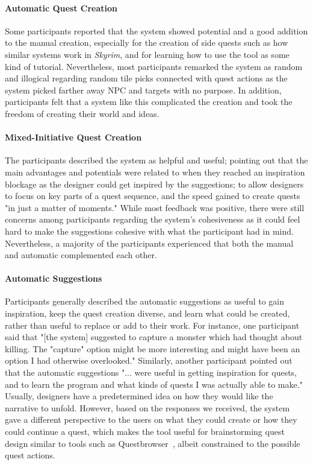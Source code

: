 \paragraph{Automatic Quest Creation}

Some participants reported that the system showed potential and a good addition to the manual creation, especially for the creation of side quests such as how similar systems work in \emph{Skyrim}, and for learning how to use the tool as some kind of tutorial. Nevertheless, most participants remarked the system as random and illogical regarding random tile picks connected with quest actions as the system picked farther away NPC and targets with no purpose. In addition, participants felt that a system like this complicated the creation and took the freedom of creating their world and ideas. 

\paragraph{Mixed-Initiative Quest Creation}

The participants described the system as helpful and useful; pointing out that the main advantages and potentials were related to when they reached an inspiration blockage as the designer could get inspired by the suggestions; to allow designers to focus on key parts of a quest sequence, and the speed gained to create quests "in just a matter of moments." While most feedback was positive, there were still concerns among participants regarding the system's cohesiveness as it could feel hard to make the suggestions cohesive with what the participant had in mind. Nevertheless, a majority of the participants experienced that both the manual and automatic complemented each other.

\paragraph{Automatic Suggestions}

Participants generally described the automatic suggestions as useful to gain inspiration, keep the quest creation diverse, and learn what could be created, rather than useful to replace or add to their work. For instance, one participant said that "[the system] suggested to capture a monster which had thought about killing. The "capture" option might be more interesting and might have been an option I had otherwise overlooked." Similarly, another participant pointed out that the automatic suggestions "... were useful in getting inspiration for quests, and to learn the program and what kinds of quests I was actually able to make." Usually, designers have a predetermined idea on how they would like the narrative to unfold. However, based on the responses we received, the system gave a different perspective to the users on what they could create or how they could continue a quest, which makes the tool useful for brainstorming quest design similar to tools such as Questbrowser~, albeit constrained to the possible quest actions.

